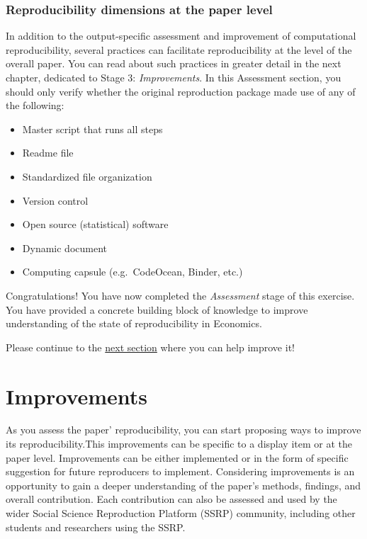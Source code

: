 \documentclass[]{book}
\providecommand{\tightlist}{%
  \setlength{\itemsep}{0pt}\setlength{\parskip}{0pt}}
\begin{document}
\hypertarget{reproducibility-dimensions-at-the-paper-level}{%
\subsection{Reproducibility dimensions at the paper level}\label{reproducibility-dimensions-at-the-paper-level}}

In addition to the output-specific assessment and improvement of computational reproducibility, several practices can facilitate reproducibility at the level of the overall paper. You can read about such practices in greater detail in the next chapter, dedicated to Stage 3: \emph{Improvements}. In this Assessment section, you should only verify whether the original reproduction package made use of any of the following:

\begin{itemize}
\tightlist
\item
  Master script that runs all steps
\item
  Readme file
\item
  Standardized file organization\\
\item
  Version control
\item
  Open source (statistical) software\\
\item
  Dynamic document\\
\item
  Computing capsule (e.g.~CodeOcean, Binder, etc.)
\end{itemize}

Congratulations! You have now completed the \emph{Assessment} stage of this exercise. You have provided a concrete building block of knowledge to improve understanding of the state of reproducibility in Economics.

Please continue to the \protect\hyperlink{improvements}{next section} where you can help improve it!

\hypertarget{improvements}{%
\chapter{Improvements}\label{improvements}}

As you assess the paper' reproducibility, you can start proposing ways to improve its reproducibility.This improvements can be specific to a display item or at the paper level. Improvements can be either implemented or in the form of specific suggestion for future reproducers to implement. Considering improvements is an opportunity to gain a deeper understanding of the paper's methods, findings, and overall contribution. Each contribution can also be assessed and used by the wider Social Science Reproduction Platform (SSRP) community, including other students and researchers using the SSRP.
\end{document}
